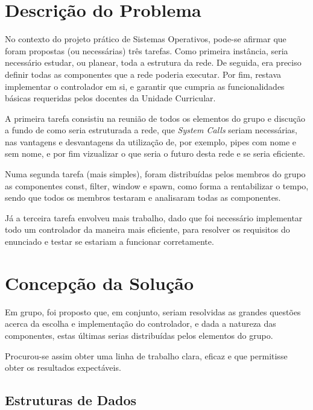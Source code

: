 \documentclass[a4paper]{article}
\begin{document}
\section{Descrição do Problema}
\label{sec:2}

\hspace{3mm} No contexto do projeto prático de Sistemas Operativos, pode-se afirmar que foram propostas (ou necessárias) três tarefas. Como primeira instância, seria necessário estudar, ou planear, toda a estrutura da rede. De seguida, era preciso definir todas as componentes que a rede poderia executar. Por fim, restava implementar o controlador em si, e garantir que cumpria as funcionalidades básicas requeridas pelos docentes da Unidade Curricular.
\par A primeira tarefa consistiu na reunião de todos os elementos do grupo e discução a fundo de como seria estruturada a rede, que \emph{System Calls} seriam necessárias, nas vantagens e desvantagens da utilização de, por exemplo, pipes com nome e sem nome, e por fim vizualizar o que seria o futuro desta rede e se seria eficiente.
\par Numa segunda tarefa (mais simples), foram distribuídas pelos membros do grupo as componentes const, filter, window e spawn, como forma a rentabilizar o tempo, sendo que todos os membros testaram e analisaram todas as componentes.
\par Já a terceira tarefa envolveu mais trabalho, dado que foi necessário implementar todo um controlador da maneira mais eficiente, para resolver os requisitos do enunciado e testar se estariam a funcionar corretamente.


\pagebreak
\section{Concepção da Solução}
\label{sec:3}

\hspace{3mm} Em grupo, foi proposto que, em conjunto, seriam resolvidas as grandes questões acerca da escolha e implementação do controlador, e dada a natureza das componentes, estas últimas serias distribuídas pelos elementos do grupo.
\par Procurou-se assim obter uma linha de trabalho clara, eficaz e que permitisse obter os resultados expectáveis.



\subsection{Estruturas de Dados} 
\label{sec:4}
\end{document}
